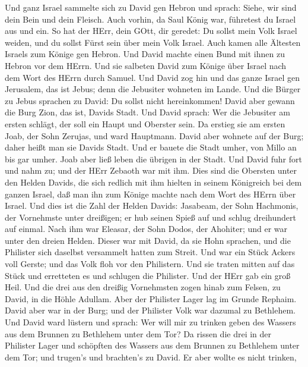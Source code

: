  Und ganz Israel sammelte sich zu David gen Hebron und
sprach: Siehe, wir sind dein Bein und dein Fleisch.  Auch
vorhin, da Saul König war, führetest du Israel aus und ein. So hat der
HErr, dein GOtt, dir geredet: Du sollst mein Volk Israel weiden, und du
sollst Fürst sein über mein Volk Israel.  Auch kamen alle
Ältesten Israels zum Könige gen Hebron. Und David machte einen Bund mit
ihnen zu Hebron vor dem HErrn. Und sie salbeten David zum Könige über
Israel nach dem Wort des HErrn durch Samuel.  Und David zog
hin und das ganze Israel gen Jerusalem, das ist Jebus; denn die
Jebusiter wohneten im Lande.  Und die Bürger zu Jebus
sprachen zu David: Du sollst nicht hereinkommen! David aber gewann die
Burg Zion, das ist, Davids Stadt.  Und David sprach: Wer die
Jebusiter am ersten schlägt, der soll ein Haupt und Oberster sein. Da
erstieg sie am ersten Joab, der Sohn Zerujas, und ward Hauptmann.
 David aber wohnete auf der Burg; daher heißt man sie Davids
Stadt.  Und er bauete die Stadt umher, von Millo an bis gar
umher. Joab aber ließ leben die übrigen in der Stadt.  Und
David fuhr fort und nahm zu; und der HErr Zebaoth war mit ihm.
 Dies sind die Obersten unter den Helden Davids, die sich
redlich mit ihm hielten in seinem Königreich bei dem ganzen Israel, daß
man ihn zum Könige machte nach dem Wort des HErrn über Israel.
 Und dies ist die Zahl der Helden Davids: Jasabeam, der
Sohn Hachmonis, der Vornehmste unter dreißigen; er hub seinen Spieß auf
und schlug dreihundert auf einmal.  Nach ihm war Eleasar,
der Sohn Dodos, der Ahohiter; und er war unter den dreien Helden.
 Dieser war mit David, da sie Hohn sprachen, und die
Philister sich daselbst versammelt hatten zum Streit. Und war ein Stück
Ackers voll Gerste; und das Volk floh vor den Philistern. 
Und sie traten mitten auf das Stück und erretteten es und schlugen die
Philister. Und der HErr gab ein groß Heil.  Und die drei
aus den dreißig Vornehmsten zogen hinab zum Felsen, zu David, in die
Höhle Adullam. Aber der Philister Lager lag im Grunde Rephaim.
 David aber war in der Burg; und der Philister Volk war
dazumal zu Bethlehem.  Und David ward lüstern und sprach:
Wer will mir zu trinken geben des Wassers aus dem Brunnen zu Bethlehem
unter dem Tor?  Da rissen die drei in der Philister Lager
und schöpften des Wassers aus dem Brunnen zu Bethlehem unter dem Tor;
und trugen's und brachten's zu David. Er aber wollte es nicht trinken,
